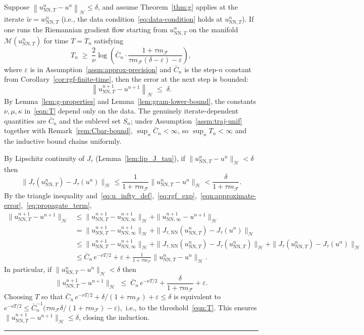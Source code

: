 \documentclass[twoside,11pt]{article}
\newcommand{\BlackBoxProof}{\rule{1.5ex}{1.5ex}}
\renewenvironment{proof}{\par\noindent{\bf Proof\ }}{\hfill\BlackBoxProof\par\medskip}
\newcommand{\nm}[1]{\left\lVert#1\right\rVert}
\newcommand{\NN}{\mathrm{NN}}
\newcommand{\calF}{\mathcal{F}}
\newcommand{\calH}{\mathcal{H}}
\newcommand{\calM}{\mathcal{M}}
\begin{document}
\begin{lemma}\label{lem:induction}
Suppose $\nm{u^n_{\NN,T} - u^n}_\calH \leq \delta$, and assume Theorem~\ref{thm:g} applies at the iterate $\tilde w=w^n_{\NN,T}$ (i.e., the data condition~\eqref{eq:data-condition} holds at $u^n_{\NN,T}$). If one runs the Riemannian gradient flow starting from $u^n_{\NN,T}$ on the manifold $\calM(u^n_{\NN,T})$ for time $T=T_n$ satisfying
\begin{equation}\label{eqn:T}
T_n \;\ge\; \frac{2}{\nu}\log\!\left(\bar C_n\cdot\frac{1+\tau m_\calF}{\tau m_\calF(\delta-\varepsilon)-\varepsilon}\right),
\end{equation}
where $\varepsilon$ is in Assumption~\ref{assm:approx-precision} and $\bar C_n$ is the step-$n$ constant from Corollary~\ref{cor:rgf-finite-time}, then the error at the next step is bounded:
\[
\nm{u^{n+1}_{\NN,T} - u^{n+1}}_\calH \;\le\;\delta.
\]
By Lemma~\ref{lem:g-properties} and Lemma~\ref{lem:gram-lower-bound}, the constants $\nu,\mu,\kappa$ in~\eqref{eqn:T} depend only on the data. The genuinely iterate-dependent quantities are $\bar C_n$ and the sublevel set $S_n$; under Assumption~\ref{assm:traj-unif} together with Remark~\ref{rem:Cbar-bound}, $\sup_n\bar C_n<\infty$, so $\sup_n T_n<\infty$ and the inductive bound chains uniformly.
\end{lemma}
\begin{proof}
By Lipschitz continuity of $J_\tau$ (Lemma~\ref{lem:lip_J_tau}), if $\|u^n_{\NN,T}-u^n\|_\calH<\delta$ then
\begin{equation}\label{eq:propagate_term}
\|J_\tau(u^n_{\NN,T})-J_\tau(u^n)\|_\calH
\le \frac{1}{1+\tau m_\calF}\|u^n_{\NN,T}-u^n\|_\calH
<\frac{\delta}{1+\tau m_\calF}.
\end{equation}
By the triangle inequality and~\eqref{eq:u_infty_def},~\eqref{eq:rgf_exp},~\eqref{eqn:approximate-error},~\eqref{eq:propagate_term},
\begin{align}\label{eq:error_prop}
\|u^{n+1}_{\NN,T}-u^{n+1}\|_\calH
&\le \|u^{n+1}_{\NN,T}-u^{n+1}_{\NN,\infty}\|_\calH + \|u^{n+1}_{\NN,\infty}-u^{n+1}\|_\calH \nonumber\\
&= \|u^{n+1}_{\NN,T}-u^{n+1}_{\NN,\infty}\|_\calH + \|J_{\tau,\NN}(u^n_{\NN,T})-J_\tau(u^n)\|_\calH \nonumber\\
&\le \|u^{n+1}_{\NN,T}-u^{n+1}_{\NN,\infty}\|_\calH + \|J_{\tau,\NN}(u^n_{\NN,T})-J_\tau(u^n_{\NN,T})\|_\calH + \|J_\tau(u^n_{\NN,T})-J_\tau(u^n)\|_\calH \nonumber\\
&\le \bar C_n\,e^{-\nu T/2}+\varepsilon+\frac{1}{1+\tau m_\calF}\|u^n_{\NN,T}-u^n\|_\calH.
\end{align}
In particular, if $\|u^n_{\NN,T}-u^n\|_\calH<\delta$ then
\[
\|u^{n+1}_{\NN,T}-u^{n+1}\|_\calH \;\le\; \bar C_n\,e^{-\nu T/2}+\frac{\delta}{1+\tau m_\calF}+\varepsilon.
\]
Choosing $T$ so that
\(
\bar C_n\,e^{-\nu T/2}+\delta/(1+\tau m_\calF)+\varepsilon\le\delta
\)
is equivalent to
\(
e^{-\nu T/2}\le \bar C_n^{-1}\bigl(\tau m_\calF\delta/(1+\tau m_\calF)-\varepsilon\bigr),
\)
i.e., to the threshold~\eqref{eqn:T}. This ensures $\|u^{n+1}_{\NN,T}-u^{n+1}\|_\calH\le\delta$, closing the induction.
\end{proof}
\end{document}
